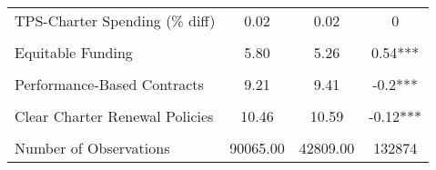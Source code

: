 \begin{table}[!h]
\begin{tabular}[t]{lccc}
TPS-Charter Spending (\% diff) & 0.02 & 0.02 & 0\\
\cellcolor{gray!10}{Total Spending (per-pupil)} & \cellcolor{gray!10}{9578.89} & \cellcolor{gray!10}{9176.46} & \cellcolor{gray!10}{402.43***}\\
Equitable Funding & 5.80 & 5.26 & 0.54***\\
\cellcolor{gray!10}{No Caps on CS Growth} & \cellcolor{gray!10}{8.87} & \cellcolor{gray!10}{8.97} & \cellcolor{gray!10}{-0.1***}\\
Performance-Based Contracts & 9.21 & 9.41 & -0.2***\\
\cellcolor{gray!10}{Transparent Charter Startup Policies} & \cellcolor{gray!10}{8.71} & \cellcolor{gray!10}{9.18} & \cellcolor{gray!10}{-0.47***}\\
Clear Charter Renewal Policies & 10.46 & 10.59 & -0.12***\\
\cellcolor{gray!10}{Exempt from State/District Regs} & \cellcolor{gray!10}{7.24} & \cellcolor{gray!10}{7.40} & \cellcolor{gray!10}{-0.16***}\\
\midrule
Number of Observations & 90065.00 & 42809.00 & 132874\\
\bottomrule
\end{tabular}
\end{table}
